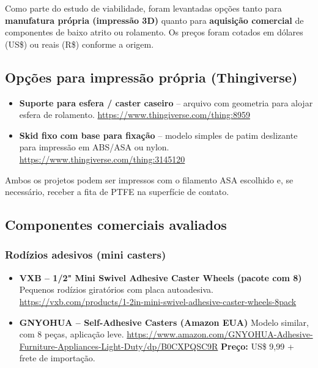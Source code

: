 \documentclass[12pt, a4paper]{article}
\begin{document}
Como parte do estudo de viabilidade, foram levantadas opções tanto para \textbf{manufatura própria (impressão 3D)} quanto para \textbf{aquisição comercial} de componentes de baixo atrito ou rolamento. Os preços foram cotados em dólares (US\$) ou reais (R\$) conforme a origem.

\subsection*{Opções para impressão própria (Thingiverse)}

\begin{itemize}
    \item \textbf{Suporte para esfera / caster caseiro} – arquivo com geometria para alojar esfera de rolamento.  
    \url{https://www.thingiverse.com/thing:8959}

    \item \textbf{Skid fixo com base para fixação} – modelo simples de patim deslizante para impressão em ABS/ASA ou nylon.  
    \url{https://www.thingiverse.com/thing:3145120}
\end{itemize}

Ambos os projetos podem ser impressos com o filamento ASA escolhido e, se necessário, receber a fita de PTFE na superfície de contato.

\subsection*{Componentes comerciais avaliados}

\subsubsection*{Rodízios adesivos (mini casters)}

\begin{itemize}
    \item \textbf{VXB – 1/2" Mini Swivel Adhesive Caster Wheels (pacote com 8)}  
    Pequenos rodízios giratórios com placa autoadesiva.  
    \url{https://vxb.com/products/1-2in-mini-swivel-adhesive-caster-wheels-8pack}

    \item \textbf{GNYOHUA – Self-Adhesive Casters (Amazon EUA)}  
    Modelo similar, com 8 peças, aplicação leve.  
    \url{https://www.amazon.com/GNYOHUA-Adhesive-Furniture-Appliances-Light-Duty/dp/B0CXPQSC9R}  
    \textbf{Preço:} US\$ 9,99 + frete de importação.
\end{itemize}
\end{document}
